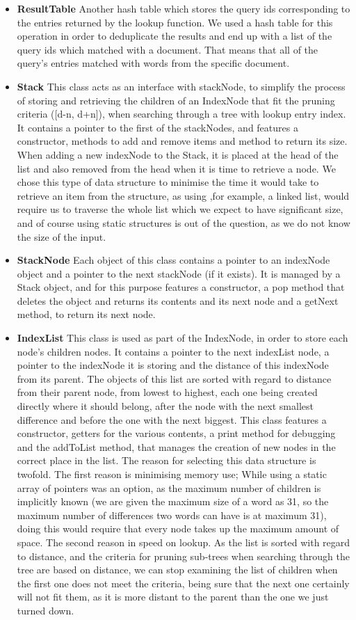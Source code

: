 \documentclass{article}
\begin{document}
\begin{itemize}
  \item \textbf{ResultTable}
  Another hash table which stores the query ids corresponding to the entries returned by the lookup function. We used a hash table for this operation in order to deduplicate the results and end up with a list of the query ids which matched with a document. That means that all of the query's entries matched with words from the specific document.
  \item \textbf{Stack}
  This class acts as an interface with stackNode, to simplify the process of storing and retrieving the children of an IndexNode that fit the pruning criteria ([d-n, d+n]), when searching through a tree with lookup entry index. It contains a pointer to the first of the stackNodes, and features a constructor, methods to add and remove items and method to return its size. When adding a new indexNode to the Stack, it is placed at the head of the list and also removed from the head when it is time to retrieve a node. We chose this type of data structure to minimise the time it would take to retrieve an item from the structure, as using ,for example, a linked list, would require us to traverse the whole list which we expect to have significant size, and of course using static structures is out of the question, as we do not know the size of the input.
  \item \textbf{StackNode}
  Each object of this class contains a pointer to an indexNode object and a pointer to the next stackNode (if it exists). It is managed by a Stack object, and for this purpose features a constructor, a pop method that deletes the object and returns its contents and its next node and a getNext method, to return its next node.
  \item \textbf{IndexList}
  This class is used as part of the IndexNode, in order to store each node's children nodes. It contains a pointer to the next indexList node, a pointer to the indexNode it is storing and the distance of this indexNode from its parent. The objects of this list are sorted with regard to distance from their parent node, from lowest to highest, each one being created directly where it should belong, after the node with the next smallest difference and before the one with the next biggest. This class features a constructor, getters for the various contents, a print method for debugging and the addToList method, that manages the creation of new nodes in the correct place in the list. The reason for selecting this data structure is twofold. The first reason is minimising memory use; While using a static array of pointers was an option, as the maximum number of children is implicitly known (we are given the maximum size of a word as 31, so the maximum number of differences two words can have is at maximum 31), doing this would require that every node takes up the maximum amount of space. The second reason in speed on lookup. As the list is sorted with regard to distance, and the criteria for pruning sub-trees when searching through the tree are based on distance, we can stop examining the list of children when the first one does not meet the criteria, being sure that the next one certainly will not fit them, as it is more distant to the parent than the one we just turned down. 

\end{itemize}
\end{document}
